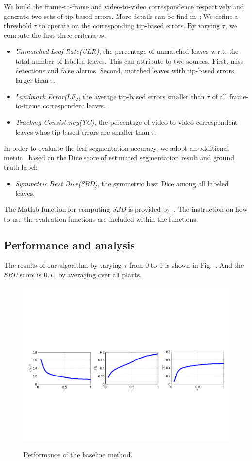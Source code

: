 We build the frame-to-frame and video-to-video correspondence respectively and generate two sets of tip-based errors.
More details can be find in~\cite{};
We define a threshold $\tau$ to operate on the corresponding tip-based errors.
By varying $\tau$, we compute the first three criteria as:
\begin{itemize}
  \item {\it{Unmatched Leaf Rate(ULR)}}, the percentage of unmatched leaves w.r.t. the total number of labeled leaves. This can attribute to two sources. First, miss detections and false alarms. Second, matched leaves with tip-based errors larger than $\tau$.
  \item {\it{Landmark Error(LE)}}, the average tip-based errors smaller than $\tau$ of all frame-to-frame correspondent leaves.
  \item {\it{Tracking Consistency(TC)}}, the percentage of video-to-video correspondent leaves whos tip-based errors are smaller than $\tau$.
\end{itemize}

In order to evaluate the leaf segmentation accuracy, we adopt an additional metric~\cite{scharr2014annotated} based on the Dice score of estimated segmentation result and ground truth label:
\begin{itemize}
  \item {\it{Symmetric Best Dice(SBD)}}, the symmetric best Dice among all labeled leaves.
\end{itemize}

The Matlab function for computing {\it{SBD}} is provided by~\cite{scharr2014annotated}.
The instruction on how to use the evaluation functions are included within the functions.


\subsection{Performance and analysis}
The results of our algorithm by varying $\tau$ from 0 to 1 is shown in Fig.~.
And the {\it{SBD}} score is $0.51$ by averaging over all plants.

\begin{figure}
\centering
\includegraphics[width=.98\textwidth]{Figures/performance}\\
\caption{Performance of the baseline method.}
\label{fig:performance}
\end{figure}



